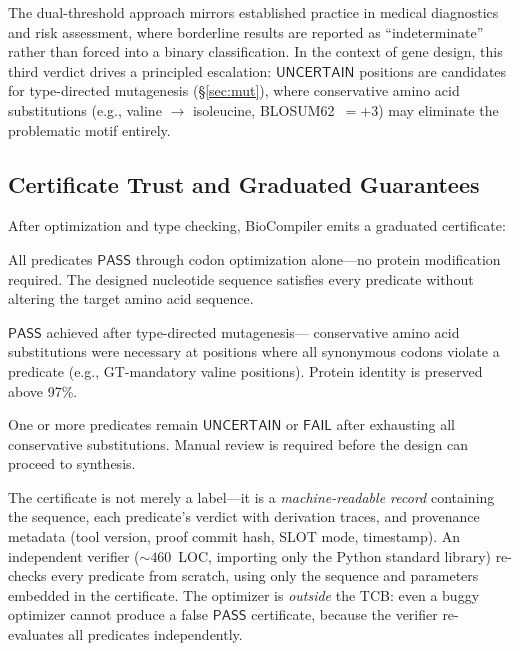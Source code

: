 \documentclass[acmsmall,review,anonymous]{acmart}
\newcommand{\PASS}{\ensuremath{\mathsf{PASS}}\xspace}
\newcommand{\FAIL}{\ensuremath{\mathsf{FAIL}}\xspace}
\newcommand{\UNCERTAIN}{\ensuremath{\mathsf{UNCERTAIN}}\xspace}
\newcommand{\GOLD}{\textsc{Gold}\xspace}
\newcommand{\SILVER}{\textsc{Silver}\xspace}
\newcommand{\BRONZE}{\textsc{Bronze}\xspace}
\begin{document}
The dual-threshold approach mirrors established practice in medical
diagnostics and risk assessment, where borderline results are reported
as ``indeterminate'' rather than forced into a binary classification.
In the context of gene design, this third verdict drives a principled
escalation: \UNCERTAIN{} positions are candidates for type-directed
mutagenesis (\S\ref{sec:mut}), where conservative amino acid
substitutions (e.g., valine $\to$ isoleucine, BLOSUM62~$= +3$) may
eliminate the problematic motif entirely.

\subsection{Certificate Trust and Graduated Guarantees}

After optimization and type checking, BioCompiler emits a graduated
certificate:
\begin{description}[leftmargin=!,labelwidth=1.4cm,itemsep=1pt,
                     topsep=1pt]
\item[\GOLD] All predicates \PASS{} through codon optimization
      alone---no protein modification required.
      The designed nucleotide sequence satisfies every predicate
      without altering the target amino acid sequence.
\item[\SILVER] \PASS{} achieved after type-directed mutagenesis---
      conservative amino acid substitutions were necessary at positions
      where all synonymous codons violate a predicate (e.g.,
      GT-mandatory valine positions).
      Protein identity is preserved above 97\%.
\item[\BRONZE] One or more predicates remain \UNCERTAIN{} or \FAIL{}
      after exhausting all conservative substitutions.
      Manual review is required before the design can proceed to
      synthesis.
\end{description}

The certificate is not merely a label---it is a \emph{machine-readable
record} containing the sequence, each predicate's verdict with
derivation traces, and provenance metadata (tool version, proof commit
hash, SLOT mode, timestamp).
An independent verifier (${\sim}460$~LOC, importing only the Python
standard library) re-checks every predicate from scratch, using only
the sequence and parameters embedded in the certificate.
The optimizer is \emph{outside} the TCB: even a buggy optimizer
cannot produce a false \PASS{} certificate, because the verifier
re-evaluates all predicates independently.
\end{document}

